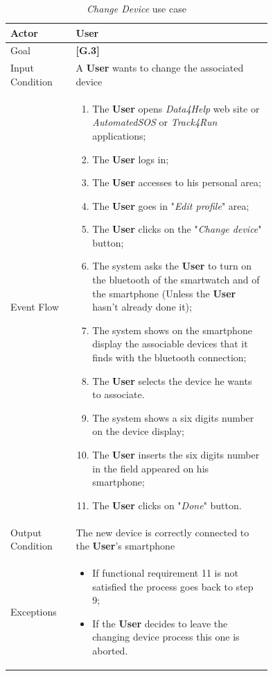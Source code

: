 \begin{center}
\begin{table}[H]
\begin{tabular}{ | l | p{0.75\linewidth} | }
  \hline
    Actor & \textbf{User} \\ \hline
    Goal & \textbf{[G.3]} \\ \hline
    Input Condition & A \textbf{User} wants to change the associated device\\ \hline
    Event Flow & \begin{minipage}[t]{0.7\textwidth}
      \begin{enumerate}
        \item The \textbf{User} opens \textit{Data4Help} web site or \textit{AutomatedSOS} or \textit{Track4Run} applications;
        \item The \textbf{User} logs in;
        \item The \textbf{User} accesses to his personal area;
        \item The \textbf{User} goes in "\textit{Edit profile}" area;
        \item The \textbf{User} clicks on the "\textit{Change device}" button;
        \item The system asks the \textbf{User} to turn on the bluetooth of the smartwatch and of the smartphone (Unless the \textbf{User} hasn't already done it);
        \item The system shows on the smartphone display the associable devices that it finds with the bluetooth connection;
        \item The \textbf{User} selects the device he wants to associate.
        \item The system shows a six digits number on the device display;
        \item The \textbf{User} inserts the six digits number in the field appeared on his smartphone;
        \item The \textbf{User} clicks on "\textit{Done}" button.
      \end{enumerate}
    \smallskip
  \end{minipage} \\ \hline
  Output Condition & The new device is correctly connected to the \textbf{User}'s smartphone \\ \hline
  Exceptions & \begin{minipage}[t]{0.7\textwidth}
    \begin{itemize}
      \smallskip
      \item If functional requirement 11 is not satisfied the process goes back to step 9;
      \item If the \textbf{User} decides to leave the changing device process this one is aborted.
    \end{itemize}
    \smallskip
  \end{minipage}  \\ \hline
\end{tabular}
\caption{\textit{Change Device} use case}
\label{table:changeDeviceTable}
\end{table}
\end{center}

